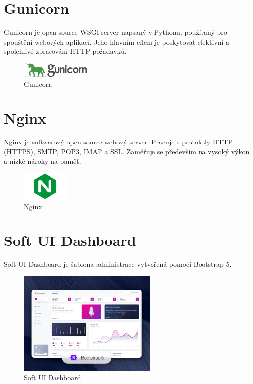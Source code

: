 \documentclass[12pt, a4paper,
twoside,        %
openright
]{report}
\begin{document}
\section{Gunicorn}
\label{sec:gunicorn}
Gunicorn je open-source WSGI server napsaný v Pythonu, používaný pro spouštění webových aplikací. Jeho hlavním cílem je poskytovat efektivní a spolehlivé zpracování HTTP požadavků.
	\begin{figure}[h!]
		\centering
		\includegraphics[width=0.3\textwidth]{image/logo-gunicorn.jpg}
		\caption{Gunicorn}
		\label{fig:gunicorn}
	\end{figure}

\section{Nginx}
\label{sec:nginx}
Nginx je softwarový open source webový server. Pracuje s protokoly HTTP (HTTPS), SMTP, POP3, IMAP a SSL. Zaměřuje se především na vysoký výkon a nízké nároky na paměť.
	\begin{figure}[h!]
		\centering
		\includegraphics[width=0.2\textwidth]{image/logo-nginx.jpg}
		\caption{Nginx}
		\label{fig:nginx}
	\end{figure}

\newpage

\section{Soft UI Dashboard}
\label{sec:softuidashboard}
Soft UI Dashboard je šablona administrace vytvořená pomocí Bootstrap 5.
	\begin{figure}[h!]
		\centering
		\includegraphics[width=0.6\textwidth]{image/soft-ui-dashboard.jpg}
		\caption{Soft UI Dashboard}
		\label{fig:softuidashboard}
	\end{figure}
\end{document}
